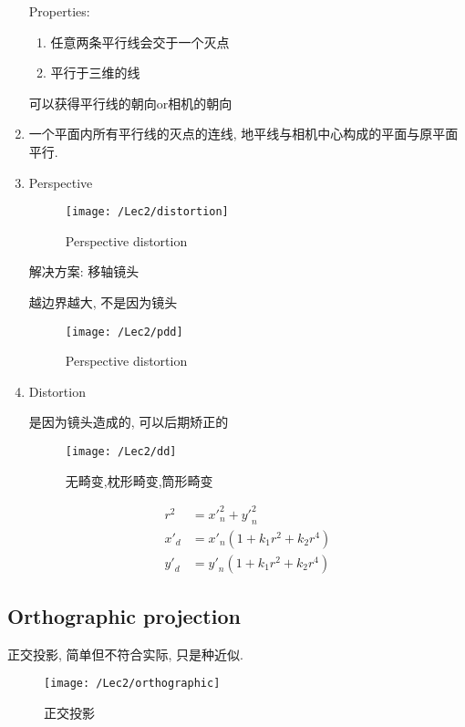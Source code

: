 \begin{enumerate}
    Properties:
    \begin{enumerate}
        \item 任意两条平行线会交于一个灭点
        \item {}  平行于三维的线
    \end{enumerate}

    可以获得平行线的朝向or相机的朝向
    
    \item {}
    
    一个平面内所有平行线的灭点的连线, 地平线与相机中心构成的平面与原平面平行. 

    \item Perspective 
    \begin{figure}[H]
        \centering
        \texttt{[image: /Lec2/distortion]}
        \caption{Perspective distortion}
    \end{figure}

    解决方案: 移轴镜头

    越边界越大, 不是因为镜头
    \begin{figure}[H]
        \centering
        \texttt{[image: /Lec2/pdd]}
        \caption{Perspective distortion}
    \end{figure}
    \item Distortion
    
    是因为镜头造成的, 可以后期矫正的
    \begin{figure}[H]
        \centering
        \texttt{[image: /Lec2/dd]}
        \caption{无畸变,枕形畸变,筒形畸变}
    \end{figure}
    \begin{align*}
        r^2&={x'}_n^2+{y'}_n^2\\
        {x'}_d&={x'}_n(1+k_1r^2+k_2r^4)\\
        {y'}_d&={y'}_n(1+k_1r^2+k_2r^4)
    \end{align*}
\end{enumerate}
\subsection{Orthographic projection}
正交投影, 简单但不符合实际, 只是种近似. 

\begin{figure}[H]
    \centering
    \texttt{[image: /Lec2/orthographic]}
    \caption{正交投影}
\end{figure}

